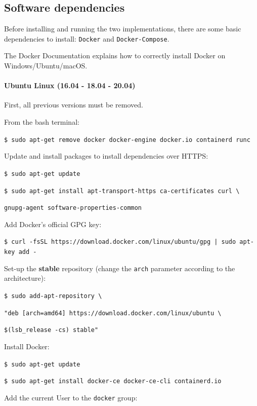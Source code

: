 \documentclass[a4paper,12pt]{article}
\begin{document}
\subsection{Software dependencies}
\label{appa}
Before installing and running the two implementations, there are some basic dependencies to install: \texttt{Docker} and \texttt{Docker-Compose}.

\label{ublin}
The Docker Documentation \cite{docker} explains how to correctly install Docker on Windows/Ubuntu/macOS.

\paragraph{Ubuntu Linux (16.04 - 18.04 - 20.04)} First, all previous versions must be removed. 

From the bash terminal:
  
\quad \texttt{\$ sudo apt-get remove docker docker-engine docker.io containerd runc}

Update and install packages to install dependencies over HTTPS:

\quad \texttt{\$ sudo apt-get update}

\quad \texttt{\$ sudo apt-get install apt-transport-https ca-certificates curl \textbackslash}

\hspace{1cm} \texttt{gnupg-agent software-properties-common}

Add Docker's official GPG key:

\quad \texttt{\$ curl -fsSL https://download.docker.com/linux/ubuntu/gpg | sudo apt-key add -}

Set-up the \textbf{stable} repository (change the \texttt{arch} parameter according to the architecture):

\quad \texttt{\$ sudo add-apt-repository \textbackslash}

\hspace{1cm} \texttt{"deb [arch=amd64] https://download.docker.com/linux/ubuntu \textbackslash}

\hspace{1cm} \texttt{\$(lsb\_release -cs) stable"}

Install Docker:

\quad \texttt{\$ sudo apt-get update}
  
\quad \texttt{\$ sudo apt-get install docker-ce docker-ce-cli containerd.io}

Add the current User to the \texttt{docker} group:
  
\end{document}
